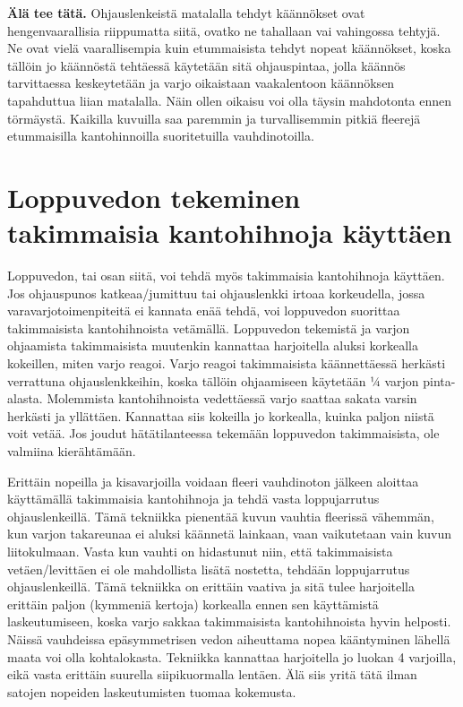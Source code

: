 \textbf{Älä tee tätä.} Ohjauslenkeistä matalalla tehdyt käännökset ovat hengenvaarallisia riippumatta siitä, ovatko ne tahallaan vai vahingossa tehtyjä. Ne ovat vielä vaarallisempia kuin etummaisista tehdyt nopeat käännökset, koska tällöin jo käännöstä tehtäessä käytetään sitä ohjauspintaa, jolla käännös tarvittaessa keskeytetään ja varjo oikaistaan vaakalentoon käännöksen tapahduttua liian matalalla. Näin ollen oikaisu voi olla täysin mahdotonta ennen törmäystä. Kaikilla kuvuilla saa paremmin ja turvallisemmin pitkiä fleerejä etummaisilla kantohinnoilla suoritetuilla vauhdinotoilla. 

\section{ Loppuvedon tekeminen takimmaisia kantohihnoja käyttäen }
\label{laskeutumistekniikat-loppuvedon-tekeminen-takimmaisia-kantohihnoja-kayttaen}


Loppuvedon, tai osan siitä, voi tehdä myös takimmaisia kantohihnoja käyttäen. Jos ohjauspunos katkeaa/jumittuu tai ohjauslenkki irtoaa korkeudella, jossa varavarjotoimenpiteitä ei kannata enää tehdä, voi loppuvedon suorittaa takimmaisista kantohihnoista vetämällä. Loppuvedon tekemistä ja varjon ohjaamista takimmaisista muutenkin kannattaa harjoitella aluksi korkealla kokeillen, miten varjo reagoi. Varjo reagoi takimmaisista käännettäessä herkästi verrattuna ohjauslenkkeihin, koska tällöin ohjaamiseen käytetään ¼ varjon pinta-alasta. Molemmista kantohihnoista vedettäessä varjo saattaa sakata varsin herkästi ja yllättäen. Kannattaa siis kokeilla jo korkealla, kuinka paljon niistä voit vetää. Jos joudut hätätilanteessa tekemään loppuvedon takimmaisista, ole valmiina kierähtämään. 


Erittäin nopeilla ja kisavarjoilla voidaan fleeri vauhdinoton jälkeen aloittaa käyttämällä takimmaisia kantohihnoja ja tehdä vasta loppujarrutus ohjauslenkeillä. Tämä tekniikka pienentää kuvun vauhtia fleerissä vähemmän, kun varjon takareunaa ei aluksi käännetä lainkaan, vaan vaikutetaan vain kuvun liitokulmaan. Vasta kun vauhti on hidastunut niin, että takimmaisista vetäen/levittäen ei ole mahdollista lisätä nostetta, tehdään loppujarrutus ohjauslenkeillä. Tämä tekniikka on erittäin vaativa ja sitä tulee harjoitella erittäin paljon (kymmeniä kertoja) korkealla ennen sen käyttämistä laskeutumiseen, koska varjo sakkaa takimmaisista kantohihnoista hyvin helposti. Näissä vauhdeissa epäsymmetrisen vedon aiheuttama nopea kääntyminen lähellä maata voi olla kohtalokasta. Tekniikka kannattaa harjoitella jo luokan 4 varjoilla, eikä vasta erittäin suurella siipikuormalla lentäen. Älä siis yritä tätä ilman satojen nopeiden laskeutumisten tuomaa kokemusta.  

